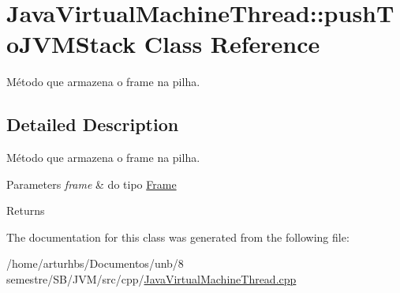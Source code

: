 \hypertarget{classJavaVirtualMachineThread_1_1pushToJVMStack}{}\section{Java\+Virtual\+Machine\+Thread\+:\+:push\+To\+J\+V\+M\+Stack Class Reference}
\label{classJavaVirtualMachineThread_1_1pushToJVMStack}


Método que armazena o frame na pilha.  




\subsection{Detailed Description}
Método que armazena o frame na pilha. 


\begin{DoxyParams}{Parameters}
{\em frame} & do tipo \hyperlink{classFrame}{Frame} \\
\hline
\end{DoxyParams}
\begin{DoxyReturn}{Returns}

\end{DoxyReturn}


The documentation for this class was generated from the following file\+:\begin{DoxyCompactItemize}
\item 
/home/arturhbs/\+Documentos/unb/8 semestre/\+S\+B/\+J\+V\+M/src/cpp/\hyperlink{JavaVirtualMachineThread_8cpp}{Java\+Virtual\+Machine\+Thread.\+cpp}\end{DoxyCompactItemize}
